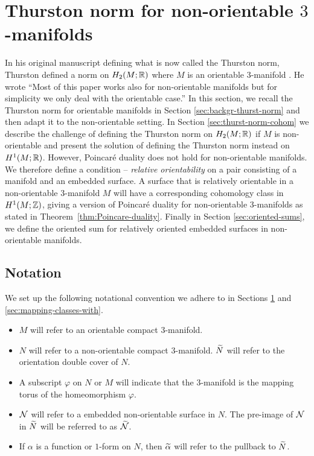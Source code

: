 \section{Thurston norm for non-orientable $3$-manifolds}
\label{sec:thur-norm-non-orientable}
In his original manuscript defining what is now called the Thurston norm, Thurston defined a norm on $H_2(M;\mathbb{R})$ where $M$ is an orientable 3-manifold \cite{thurston1986norm}.  He wrote ``Most of this paper works also for non-orientable manifolds but for simplicity we only deal with the orientable case.''
In this section, we recall the Thurston norm for orientable manifolds in Section \ref{sec:backgr-thurst-norm} and then adapt it to the non-orientable setting.
In Section \ref{sec:thurst-norm-cohom} we describe the challenge of defining the Thurston norm on $H_2(M;\mathbb{R})$ if $M$ is non-orientable and present the solution of defining the Thurston norm instead on $H^1(M;\mathbb{R})$.
However, Poincar\'e duality does not hold for non-orientable manifolds.
We therefore define a condition -- {\it relative orientability} on a pair consisting of a manifold and an embedded surface.
A surface that is relatively orientable in a non-orientable 3-manifold $M$ will have a corresponding cohomology class in $H^1(M;\mathbb{Z})$, giving a version of Poincar\'e duality for non-orientable 3-manifolds as stated in Theorem~\ref{thm:Poincare-duality}.
Finally in Section \ref{sec:oriented-sums}, we define the oriented sum for relatively oriented embedded surfaces in non-orientable manifolds.

\subsection*{Notation}

We set up the following notational convention we adhere to in Sections \ref{sec:thur-norm-non-orientable} and \ref{sec:mapping-classes-with}.
\begin{itemize}
    \item $M$ will refer to an orientable compact $3$-manifold.
    \item $N$ will refer to a non-orientable compact $3$-manifold. $\widetilde{N}$ will refer to the orientation double cover of $N$.
    \item A subscript $\varphi$ on $N$ or $M$ will indicate that the $3$-manifold is the mapping torus of the homeomorphism $\varphi$.
    \item $\mathcal{N}$ will refer to a embedded non-orientable surface in $N$. The pre-image of $\mathcal{N}$ in $\widetilde{N}$ will be referred to as $\widetilde{\mathcal{N}}$.
    \item If $\alpha$ is a function or $1$-form on $N$, then $\widetilde{\alpha}$ will refer to the pullback to $\widetilde{N}$.
\end{itemize}

